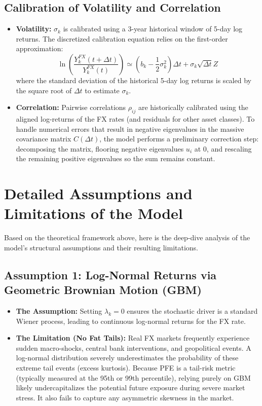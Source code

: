 \subsection*{Calibration of Volatility and Correlation}
\begin{itemize}
	\item \textbf{Volatility:} $\sigma_k$ is calibrated using a 3-year historical window of 5-day log returns. The discretized calibration equation relies on the first-order approximation:
	\begin{equation}
		\ln\left(\frac{Y_k^{FX}(t+\Delta t)}{Y_k^{FX}(t)}\right) \simeq \left(b_k - \frac{1}{2}\sigma_k^2\right)\Delta t + \sigma_k \sqrt{\Delta t} Z
	\end{equation}
	where the standard deviation of the historical 5-day log returns is scaled by the square root of $\Delta t$ to estimate $\sigma_k$.
	
	\item \textbf{Correlation:} Pairwise correlations $\rho_{ij}$ are historically calibrated using the aligned log-returns of the FX rates (and residuals for other asset classes). To handle numerical errors that result in negative eigenvalues in the massive covariance matrix $C(\Delta t)$, the model performs a preliminary correction step: decomposing the matrix, flooring negative eigenvalues $u_i$ at $0$, and rescaling the remaining positive eigenvalues so the sum remains constant.
\end{itemize}

\section{Detailed Assumptions and Limitations of the Model}
Based on the theoretical framework above, here is the deep-dive analysis of the model's structural assumptions and their resulting limitations.

\subsection*{Assumption 1: Log-Normal Returns via Geometric Brownian Motion (GBM)}
\begin{itemize}
	\item \textbf{The Assumption:} Setting $\lambda_k = 0$ ensures the stochastic driver is a standard Wiener process, leading to continuous log-normal returns for the FX rate.
	\item \textbf{The Limitation (No Fat Tails):} Real FX markets frequently experience sudden macro-shocks, central bank interventions, and geopolitical events. A log-normal distribution severely underestimates the probability of these extreme tail events (excess kurtosis). Because PFE is a tail-risk metric (typically measured at the 95th or 99th percentile), relying purely on GBM likely undercapitalizes the potential future exposure during severe market stress. It also fails to capture any asymmetric skewness in the market.
\end{itemize}

